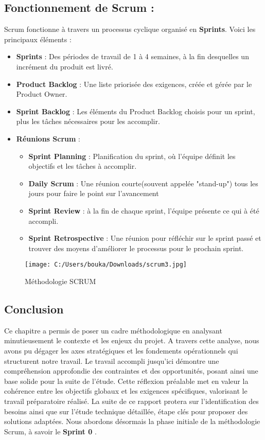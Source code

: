 \documentclass[a4paper,11pt]{report}
\begin{document}
\subsection{Fonctionnement de Scrum : }


Scrum fonctionne à travers un processus cyclique organisé en \textbf{Sprints}. Voici les principaux éléments : 
\begin{itemize}
	\item \textbf{Sprints} : Des périodes de travail de 1 à 4 semaines, à la fin desquelles un incrément du produit est livré.
	\item \textbf{Product Backlog} : Une liste priorisée des exigences, créée et gérée par le Product Owner.
	\item \textbf{Sprint Backlog} : Les éléments du Product Backlog choisis pour un sprint, plus les tâches nécessaires pour les accomplir.
	\item \textbf{Réunions Scrum } : 
	\begin{itemize}
		\item \textbf{Sprint Planning} : Planification du sprint, où l'équipe définit les objectifs et les tâches à accomplir.
		\item \textbf{Daily Scrum} : Une réunion courte(souvent appelée "stand-up") tous les jours pour faire le point sur l'avancement 
		\item \textbf{Sprint Review} : à la fin de chaque sprint, l'équipe présente ce qui à été accompli.
		\item \textbf{Sprint Retrospective} : Une réunion pour réfléchir sur le sprint passé et trouver des moyens d'améliorer le processus pour le prochain sprint.
	\end{itemize}
\end{itemize}

\begin{figure}[H]
\centering
\texttt{[image: C:/Users/bouka/Downloads/scrum3.jpg]}
\caption{Méthodologie SCRUM}
\end{figure}

\subsection{Conclusion}

Ce chapitre a permis de poser un cadre méthodologique en analysant minutieusement le contexte et les enjeux du projet. A travers cette analyse, nous avons pu dégager les axes stratégiques et les fondements opérationnels qui structurent notre travail. 
Le travail accompli jusqu'ici démontre une compréhension approfondie des contraintes et des opportunités, posant ainsi une base solide pour la suite de l'étude. Cette réflexion préalable met en valeur la cohérence entre les objectifs globaux et les exigences spécifiques, valorisant le travail préparatoire réalisé.
\newline
\newline
La suite de ce rapport protera sur l'identification des besoins ainsi que sur l'étude technique détaillée, étape clés pour proposer des solutions adaptées. Nous abordons désormais la phase initiale de la méthodologie Scrum, à savoir le \textbf{Sprint 0} .
\end{document}
